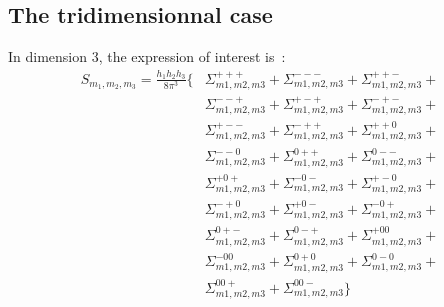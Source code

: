 \subsection{The tridimensionnal case}
In dimension 3, the expression of interest is~:
\begin{align*}
S_{m_1,m_2,m_3}=\frac{h_1h_2h_3}{8\pi^3}\Big\{& \Sigma_{m1,m2,m3}^{+++} + \Sigma_{m1,m2,m3}^{---} + \Sigma_{m1,m2,m3}^{++-} +\nonumber\\
     &\Sigma_{m1,m2,m3}^{--+} + \Sigma_{m1,m2,m3}^{+-+} + \Sigma_{m1,m2,m3}^{-+-} +\nonumber\\
     &\Sigma_{m1,m2,m3}^{+--} + \Sigma_{m1,m2,m3}^{-++} + \Sigma_{m1,m2,m3}^{++0} +\nonumber\\
     &\Sigma_{m1,m2,m3}^{--0} + \Sigma_{m1,m2,m3}^{0++} + \Sigma_{m1,m2,m3}^{0--} +\nonumber\\
     &\Sigma_{m1,m2,m3}^{+0+} + \Sigma_{m1,m2,m3}^{-0-} + \Sigma_{m1,m2,m3}^{+-0} +\nonumber\\
     &\Sigma_{m1,m2,m3}^{-+0} + \Sigma_{m1,m2,m3}^{+0-} + \Sigma_{m1,m2,m3}^{-0+} +\nonumber\\
     &\Sigma_{m1,m2,m3}^{0+-} + \Sigma_{m1,m2,m3}^{0-+} + \Sigma_{m1,m2,m3}^{+00} +\nonumber\\
     &\Sigma_{m1,m2,m3}^{-00} + \Sigma_{m1,m2,m3}^{0+0} + \Sigma_{m1,m2,m3}^{0-0} +\nonumber\\
     &\Sigma_{m1,m2,m3}^{00+} + \Sigma_{m1,m2,m3}^{00-}
\Big\}
\end{align*}

